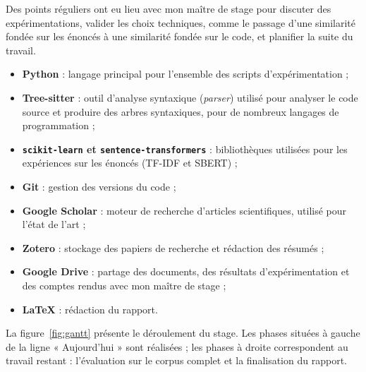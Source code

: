 \documentclass[12pt,a4paper,oneside]{report}
\begin{document}
Des points réguliers ont eu lieu avec mon maître de stage pour discuter des
expérimentations, valider les choix techniques, comme le passage d'une
similarité fondée sur les énoncés à une similarité fondée sur le code, et
planifier la suite du travail.
\begin{itemize}
    \item \textbf{Python} : langage principal pour l'ensemble des scripts
    d'expérimentation ;
    \item \textbf{Tree-sitter} : outil d'analyse syntaxique (\emph{parser})
    utilisé pour analyser le code source et produire des arbres
    syntaxiques, pour de nombreux langages de programmation ;
    \item \textbf{\texttt{scikit-learn} et \texttt{sentence-transformers}} :
    bibliothèques utilisées pour les expériences sur les énoncés (TF-IDF
    et SBERT) ;
    \item \textbf{Git} : gestion des versions du code ;
    \item \textbf{Google Scholar} : moteur de recherche d'articles
    scientifiques, utilisé pour l'état de l'art ;
    \item \textbf{Zotero} : stockage des papiers de recherche et rédaction des résumés  ;
    \item \textbf{Google Drive} : partage des documents, des résultats
    d'expérimentation et des comptes rendus avec mon maître de stage ;
    \item \textbf{\LaTeX} : rédaction du rapport.
\end{itemize}

La figure~\ref{fig:gantt} présente le déroulement du stage. Les phases
situées à gauche de la ligne « Aujourd'hui » sont réalisées ; les phases à
droite correspondent au travail restant : l'évaluation sur le corpus
complet et la finalisation du rapport.
\end{document}
